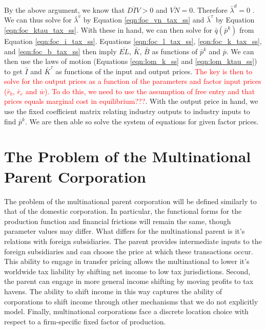 By the above argument, we know that $\overline{DIV}>0$ and $\overline{VN}=0$.  Therefore $\bar{\lambda}^{d}=0$ .  We can thus solve for $\bar{\lambda}^{v}$ by Equation \ref{eqn:foc_vn_tax_ss} and $\bar{\lambda}^{\tau}$ by Equation \ref{eqn:foc_ktau_tax_ss}.  With these in hand, we can then solve for $\bar{q}(\bar{p}^{k})$ from Equation \ref{eqn:foc_i_tax_ss}.  Equations \ref{eqn:foc_l_tax_ss}, \ref{eqn:foc_k_tax_ss}, and \ref{eqn:foc_b_tax_ss} then imply $\bar{EL}$, $\bar{K}$, $\bar{B}$ as functions of $\bar{p}^{k}$ and $\bar{p}$.    We can then use the laws of motion (Equations \ref{eqn:lom_k_ss} and \ref{eqn:lom_ktau_ss}) to get $\bar{I}$ and $\bar{K}^{\tau}$ as functions of the input and output prices.  \textcolor{red}{The key is then to solve for the output prices as a function of the parameters and factor input prices ($\bar{r}_{b}$, $\bar{r}_{e}$ and $\bar{w}$).  To do this, we need to use the assumption of free entry and that prices equals marginal cost in equilibrium???}.  With the output price in hand, we use the fixed coefficient matrix relating industry outputs to industry inputs to find $\bar{p}^{k}$.  We are then able so solve the system of equations for given factor prices.  



\section{The Problem of the Multinational Parent Corporation}

The problem of the multinational parent corporation will be defined similarly to that of the domestic corporation.  In particular, the functional forms for the production function and financial frictions will remain the same, though parameter values may differ.  What differs for the multinational parent is it's relations with foreign subsidiaries.  The parent provides intermediate inputs to the foreign subsidiaries and can choose the price at which these transactions occur.  This ability to engage in transfer pricing allows the multinational to lower it's worldwide tax liability by shifting net income to low tax jurisdictions.  Second, the parent can engage in more general income shifting by moving profits to tax havens.  The ability to shift income in this way captures the ability of corporations to shift income through other mechanisms that we do not explicitly model.  Finally, multinational corporations face a discrete location choice with respect to a firm-specific fixed factor of production.  

